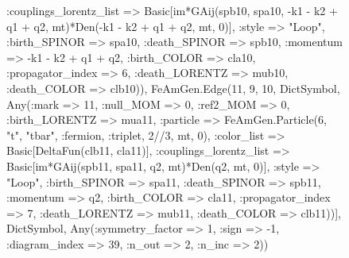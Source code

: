 \documentclass{revtex4}
\begin{document}
\begin{figure}[!htb]
\begin{center}
{:couplings_lorentz_list => Basic[im*GAij(spb10, spa10, -k1 - k2 + q1 + q2, mt)*Den(-k1 - k2 + q1 + q2, mt, 0)], :style => "Loop", :birth_SPINOR => spa10, :death_SPINOR => spb10, :momentum => -k1 - k2 + q1 + q2, :birth_COLOR => cla10, :propagator_index => 6, :death_LORENTZ => mub10, :death_COLOR => clb10)), FeAmGen.Edge(11, 9, 10, Dict{Symbol, Any}(:mark => 11, :null_MOM => 0, :ref2_MOM => 0, :birth_LORENTZ => mua11, :particle => FeAmGen.Particle(6, "t", "tbar", :fermion, :triplet, 2//3, mt, 0), :color_list => Basic[DeltaFun(clb11, cla11)], :couplings_lorentz_list => Basic[im*GAij(spb11, spa11, q2, mt)*Den(q2, mt, 0)], :style => "Loop", :birth_SPINOR => spa11, :death_SPINOR => spb11, :momentum => q2, :birth_COLOR => cla11, :propagator_index => 7, :death_LORENTZ => mub11, :death_COLOR => clb11))], Dict{Symbol, Any}(:symmetry_factor => 1, :sign => -1, :diagram_index => 39, :n_out => 2, :n_inc => 2)) 
}
\end{center}
\end{figure}
\end{document}
